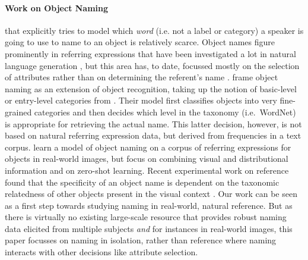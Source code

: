 \paragraph{Work on Object Naming} that explicitly tries to model which \textit{word} (i.e. not a label or category) a speaker is going to use to name to an object is relatively scarce.
Object names figure prominently in referring expressions that have been investigated a lot in natural language generation \cite{dale:1995,krahmer:2012}, but this area has, to date, focussed mostly on the selection of attributes rather than on determining the referent's name \cite{krahmer:2012,Kazemzadeh2014}. 
 frame object naming as an extension of object recognition, taking up the notion of basic-level or entry-level categories from \cite{rosch1976basic}.
Their model first classifies objects into very fine-grained categories and then decides which level in the taxonomy (i.e.\ WordNet) is appropriate for retrieving the actual name.
This latter decision, however, is not based on natural referring expression data, but derived from frequencies in a text corpus. 
  learn a model of object naming on a corpus of referring expressions for objects in real-world images, but focus on combining visual and distributional information and on zero-shot learning. 
 Recent experimental work on reference found that the specificity of an object name is dependent on the taxonomic relatedness of other objects present in the visual context
\cite{rohde2012communicating,graf2016animal}. Our work can be seen as a first step towards studying naming in real-world, natural reference.
But as there is virtually no existing large-scale resource that provides robust naming data elicited from multiple subjects \textit{and} for instances in real-world images, this paper focusses on naming in isolation, rather than reference where naming interacts with other decisions like attribute selection.





